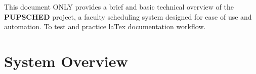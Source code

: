 \documentclass[12pt,letterpaper]{article}
\begin{document}
\coverpage 

\renewcommand{\contentsname}{\centering\sffamily\Large Table of Contents}
\renewcommand{\cftsecleader}{\cftdotfill{\cftdotsep}}

\renewcommand{\cftsecfont}{\sffamily\bfseries\color{darkgray}}
\renewcommand{\cftsecpagefont}{\sffamily\bfseries\color{darkgray}}

\renewcommand{\cftsubsecfont}{\sffamily\color{gray}}
\renewcommand{\cftsubsecpagefont}{\sffamily\color{gray}}

\renewcommand{\cftsubsubsecfont}{\sffamily\color{lightgray}}
\renewcommand{\cftsubsubsecpagefont}{\sffamily\color{lightgray}}

\setlength{\cftbeforesecskip}{8pt}

\newpage

\begin{tcolorbox}[githubnote]
This document ONLY provides a brief and basic technical overview of the \textbf{PUPSCHED} project, 
a faculty scheduling system designed for ease of use and automation. To test and practice laTex documentation workflow.
\end{tcolorbox} 

\vspace{3em} 
\section{System Overview}
\end{document}
